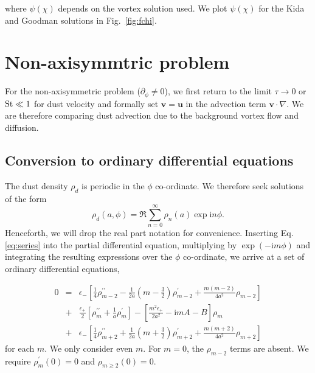 \documentclass[useAMS,8pt,twocolumn]{article}
\newcommand{\Fig}[1]{Fig.~\ref{#1}}
\newcommand{\fig}[1]{\Fig{#1}}
\newcommand{\beq}{\begin{equation}}
\newcommand{\eeq}{\end{equation}}
\newcommand{\beqn}{\begin{eqnarray}}
\newcommand{\eeqn}{\end{eqnarray}}
\begin{document}
\noindent where $\psi(\chi)$ depends on the vortex solution used. We plot 
$\psi(\chi)$ for the Kida and Goodman solutions in \fig{fig:fchi}.





\section{Non-axisymmtric problem}
For the non-axisymmetric problem ($\partial_\phi\neq0$), we first
return to the limit $\tau\to0$ or $\rm{St}\ll 1$ for dust velocity and
formally set $\bm{v}=\bm{u}$ in the advection term 
$\bm{v}\cdot\nabla$. We are therefore comparing dust advection due to
the background vortex flow and diffusion. 

\subsection{Conversion to ordinary differential equations}
The dust density $\rho_d$ is periodic in the $\phi$ co-ordinate. We
therefore seek solutions of the form
\beq\label{eq:series}
\rho_d(a,\phi) = \Re\sum_{n=0}^\infty\rho_n(a)\exp{\mathrm{i}n\phi}. 
\eeq
Henceforth, we will drop the real part notation for convenience. Inserting
Eq. \ref{eq:series} into the partial differential equation,
multiplying by $\exp{(-\mathrm{i}m\phi)}$ and integrating the resulting
expressions over the $\phi$ co-ordinate, we arrive at a set of
ordinary differential equations,

\beqn\label{eq:ode1}
0&=&\epsilon_{-}\left[\frac{1}{4}\rho_{m-2}^{\prime\prime}
-\frac{1}{2a}\left(m-\frac{3}{2}\right)\rho_{m-2}^\prime +
\frac{m(m-2)}{4a^2}\rho_{m-2}\right] \nonumber\\
&+&\frac{\epsilon_+}{2}\left[\rho_m^{\prime\prime}+\frac{1}{a}\rho_m^\prime\right] 
-\left[\frac{m^2\epsilon_+}{2a^2}-\mathrm{i}mA-B\right]\rho_m\nonumber\\
&+&\epsilon_{-}\left[\frac{1}{4}\rho_{m+2}^{\prime\prime}
+\frac{1}{2a}\left(m+\frac{3}{2}\right)\rho_{m+2}^\prime +
\frac{m(m+2)}{4a^2}\rho_{m+2} \right]
\eeqn
for each $m$. We only consider even $m$. For $m=0$, the $\rho_{m-2}$
terms are absent. We require $\rho_m^\prime(0)=0$ and $\rho_{m\geq2}(0)=0$. 
\end{document}
